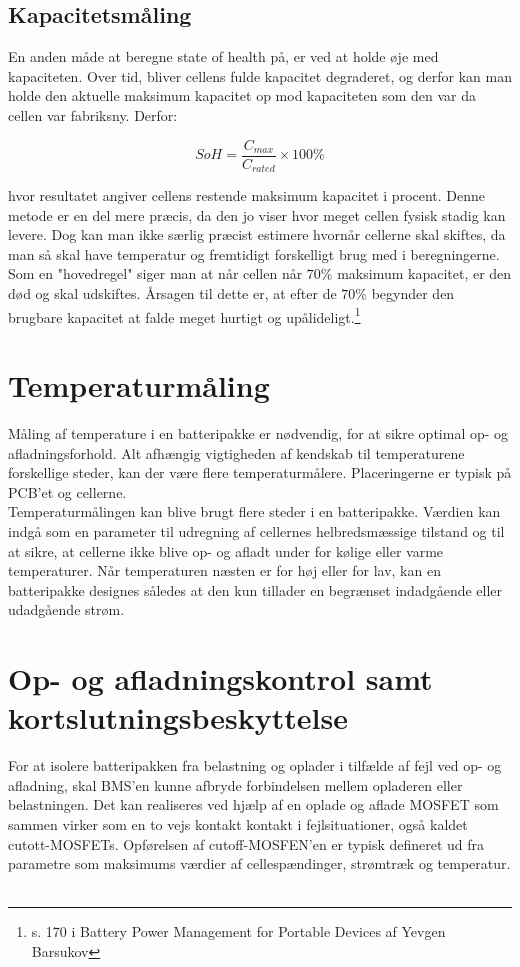\subsection{Kapacitetsmåling}
En anden måde at beregne state of health på, er ved at holde øje med kapaciteten. Over tid, bliver cellens fulde kapacitet degraderet, og derfor kan man holde den aktuelle maksimum kapacitet op mod kapaciteten som den var da cellen var fabriksny. Derfor: 

\begin {equation} 
SoH = \frac{C_{max}}{C_{rated}}\times 100\percent \label{eq:soh_capacity}
\end {equation}

hvor resultatet angiver cellens restende maksimum kapacitet i procent. Denne metode er en del mere præcis, da den jo viser hvor meget cellen fysisk stadig kan levere. Dog kan man ikke særlig præcist estimere hvornår cellerne skal skiftes, da man så skal have temperatur og fremtidigt forskelligt brug med i beregningerne.\\ 

Som en "hovedregel" \space siger man at når cellen når $70\percent$ maksimum kapacitet, er den død og skal udskiftes. Årsagen til dette er, at efter de $70\percent$ begynder den brugbare kapacitet at falde meget hurtigt og upålideligt.\footnote{s. 170 i Battery Power Management for Portable Devices af Yevgen Barsukov}

\section{Temperaturmåling}
Måling af temperature i en batteripakke er nødvendig, for at sikre optimal op- og afladningsforhold. Alt afhængig vigtigheden af kendskab til temperaturene forskellige steder, kan der være flere temperaturmålere. Placeringerne er typisk på PCB'et og cellerne.
\\

Temperaturmålingen kan blive brugt flere steder i en batteripakke. Værdien kan indgå som en parameter til udregning af cellernes helbredsmæssige tilstand og til at sikre, at cellerne ikke blive op- og afladt under for kølige eller varme temperaturer. Når temperaturen næsten er for høj eller for lav, kan en batteripakke designes således at den kun tillader en begrænset indadgående eller udadgående strøm.

\section{Op- og afladningskontrol samt kortslutningsbeskyttelse}
For at isolere batteripakken fra belastning og oplader i tilfælde af fejl ved op- og afladning, skal BMS'en kunne afbryde forbindelsen mellem opladeren eller belastningen. Det kan realiseres ved hjælp af en oplade og aflade MOSFET som sammen virker som en to vejs kontakt kontakt i fejlsituationer, også kaldet cutott-MOSFETs. Opførelsen af cutoff-MOSFEN'en er typisk defineret ud fra parametre som maksimums værdier af cellespændinger, strømtræk og temperatur. 
\
